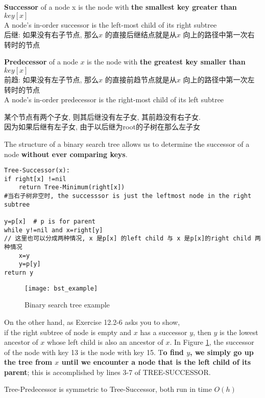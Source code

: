 \documentclass{article}
\begin{document}
\textbf{Successor} of a node x is the node with \textbf{the smallest key greater than $key[x]$}\\
A node's in-order successor is the left-most child of its right subtree\\
后继: 如果没有右子节点, 那么$x$ 的直接后继结点就是从$x$ 向上的路径中第一次右转时的节点

\textbf{Predecessor} of a node $x$ is the node with \textbf{the greatest key smaller than $key[x]$}\\
前趋: 如果没有左子节点, 那么$x$ 的直接前趋节点就是从$x$ 向上的路径中第一次左转时的节点\\
A node's in-order predecessor is the right-most child of its left subtree

某个节点有两个子女, 则其后继没有左子女, 其前趋没有右子女.\\
因为如果后继有左子女, 由于以后继为root的子树在那么左子女

The structure of a binary search tree allows us to determine the successor of a node \textbf{without ever comparing keys}.

\begin{verbatim}
Tree-Successor(x):
if right[x] !=nil
    return Tree-Minimum(right[x])
#当右子树非空时, the successsor is just the leftmost node in the right subtree

y=p[x]  # p is for parent
while y!=nil and x=right[y]
// 这里也可以分成两种情况, x 是p[x] 的left child 与 x 是p[x]的right child 两种情况
    x=y
    y=p[y]
return y
\end{verbatim}

\begin{figure}[htbp]
  \centering
  \texttt{[image: bst\_example]}\\
  \caption{Binary search tree example}\label{fig.bst.example}
\end{figure}

On the other hand, as Exercise 12.2-6 asks you to show, \\
if the right subtree of node is empty and $x$ has a successor $y$, then $y$ is the lowest ancestor of $x$ whose left child is also an ancestor of $x$. In Figure \ref{fig.bst.example}, the successor of the node with key 13 is the node with key 15. T\textbf{o find $y$, we simply go up the tree from $x$ until we encounter a node that is the left child of its parent}; this is accomplished by lines 3-7 of TREE-SUCCESSOR.

Tree-Predecessor is symmetric to Tree-Successor, both run in time $O(h)$
\end{document}
